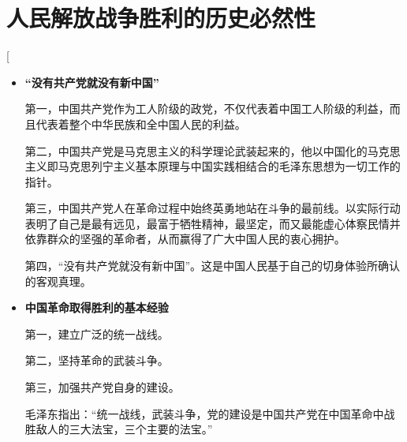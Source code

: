\section{人民解放战争胜利的历史必然性}
\begin{enumerate}
    \ans[
        \begin{itemize}
            \item{\textbf{“没有共产党就没有新中国”}\par
                第一，中国共产党作为工人阶级的政党，不仅代表着中国工人阶级的利益，而且代表着整个中华民族和全中国人民的利益。\par
                第二，中国共产党是马克思主义的科学理论武装起来的，他以中国化的马克思主义即马克思列宁主义基本原理与中国实践相结合的毛泽东思想为一切工作的指针。\par
                第三，中国共产党人在革命过程中始终英勇地站在斗争的最前线。以实际行动表明了自己是最有远见，最富于牺牲精神，最坚定，而又最能虚心体察民情并依靠群众的坚强的革命者，从而赢得了广大中国人民的衷心拥护。\par
                第四，“没有共产党就没有新中国”。这是中国人民基于自己的切身体验所确认的客观真理。
            }
            \item{\textbf{中国革命取得胜利的基本经验}\par
                第一，建立广泛的统一战线。\par
                第二，坚持革命的武装斗争。\par
                第三，加强共产党自身的建设。\par
                毛泽东指出：“统一战线，武装斗争，党的建设是中国共产党在中国革命中战胜敌人的三大法宝，三个主要的法宝。”\par
}
\end{itemize}
\end{enumerate}
